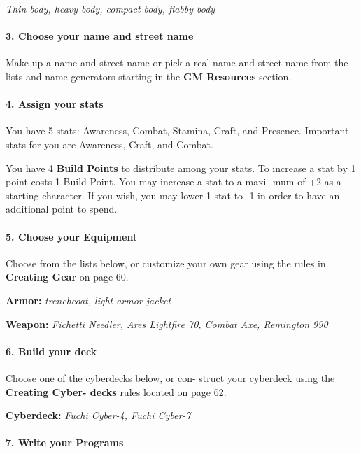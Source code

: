 \begin{multicols}{3}
\textit{Thin body, heavy body, compact body, flabby
body}

\paragraph{3.  Choose your name and street name}

Make up a name and street name or pick a real
name and street name from the lists and name
generators starting in the \textbf{GM Resources} section.

\paragraph{4.  Assign your stats}

You have 5 stats: Awareness, Combat, Stamina,
Craft, and Presence. Important stats for you are
Awareness, Craft, and Combat.

You have 4 \textbf{Build Points} to distribute among
your stats. To increase a stat by 1 point costs 1
Build Point. You may increase a stat to a maxi-
mum of +2 as a starting character. If you wish,
you may lower 1 stat to -1 in order to have an
additional point to spend.

\paragraph{5.  Choose your Equipment}

Choose from the lists below, or customize your
own gear using the rules in \textbf{Creating Gear} on
page 60.

\textbf{Armor:} \textit{trenchcoat, light armor jacket}

\textbf{Weapon:} \textit{Fichetti Needler, Ares Lightfire 70,
Combat Axe, Remington 990}

\paragraph{6.  Build your deck}

Choose one of the cyberdecks below, or con-
struct your cyberdeck using the \textbf{Creating Cyber-
decks} rules located on page 62.

\textbf{Cyberdeck:} \textit{Fuchi Cyber-4, Fuchi Cyber-7}

\paragraph{7.  Write your Programs}


\end{multicols}

